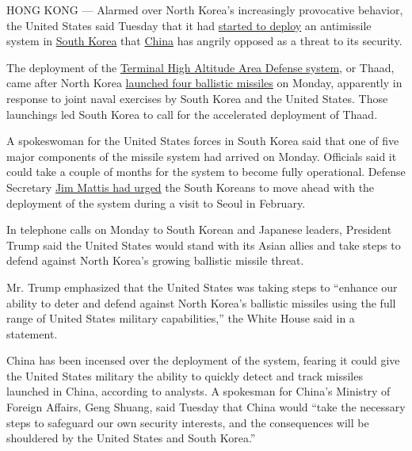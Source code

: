 HONG KONG --- Alarmed over North Korea's increasingly provocative
behavior, the United States said Tuesday that it had
\href{https://www.youtube.com/watch?v=BI68rmNQWXQ}{started to deploy} an
antimissile system in
\href{https://www.nytimes.com/topic/destination/south-korea?8qa}{South
Korea} that
\href{https://www.nytimes.com/topic/destination/china?inline=nyt-geo}{China}
has angrily opposed as a threat to its security.

The deployment of the
\href{http://www.lockheedmartin.com/us/products/thaad.html}{Terminal
High Altitude Area Defense system}, or Thaad, came after North Korea
\href{https://www.nytimes.com/2017/03/05/world/north-korea-ballistic-missiles.html?rref=collection\%2Ftimestopic\%2FSouth\%20Korea\&action=click\&contentCollection=world\&region=stream\&module=stream_unit\&version=latest\&contentPlacement=4\&pgtype=collection}{launched
four ballistic missiles} on Monday, apparently in response to joint
naval exercises by South Korea and the United States. Those launchings
led South Korea to call for the accelerated deployment of Thaad.

A spokeswoman for the United States forces in South Korea said that one
of five major components of the missile system had arrived on Monday.
Officials said it could take a couple of months for the system to become
fully operational. Defense Secretary
\href{https://www.nytimes.com/2017/02/02/world/asia/james-mattis-us-korea-thaad.html}{Jim
Mattis had urged} the South Koreans to move ahead with the deployment of
the system during a visit to Seoul in February.

In telephone calls on Monday to South Korean and Japanese leaders,
President Trump said the United States would stand with its Asian allies
and take steps to defend against North Korea's growing ballistic missile
threat.

Mr. Trump emphasized that the United States was taking steps to
``enhance our ability to deter and defend against North Korea's
ballistic missiles using the full range of United States military
capabilities,'' the White House said in a statement.

China has been incensed over the deployment of the system, fearing it
could give the United States military the ability to quickly detect and
track missiles launched in China, according to analysts. A spokesman for
China's Ministry of Foreign Affairs, Geng Shuang, said Tuesday that
China would ``take the necessary steps to safeguard our own security
interests, and the consequences will be shouldered by the United States
and South Korea.''

